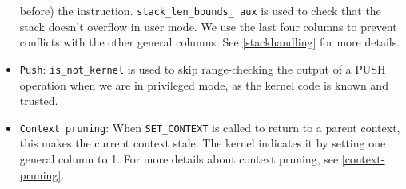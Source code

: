 \begin{itemize}
before) the instruction. \texttt{stack\_len\_bounds\_ aux} is used to check that the stack doesn't overflow in user mode. We use the last four columns to prevent conflicts with the other general columns.
See \ref{stackhandling} for more details.
    \label{push_general_view}
    \item  \texttt{Push}: \texttt{is\_not\_kernel} is used to skip range-checking the output of a PUSH operation when we are in privileged mode, as the kernel code is known and trusted.
    \item  \texttt{Context pruning}: When \texttt{SET\_CONTEXT} is called to return to a parent context, this makes the current context stale. The kernel indicates it
by setting one general column to 1. For more details about context pruning, see \ref{context-pruning}.
\end{itemize}
